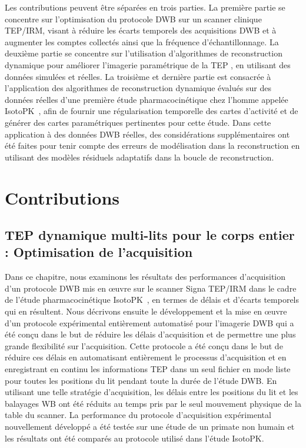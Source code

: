 Les contributions peuvent être séparées en trois parties. La première partie se concentre sur l'optimisation du protocole DWB sur un scanner clinique TEP/IRM, visant à réduire les écarts temporels des acquisitions DWB et à augmenter les comptes collectés ainsi que la fréquence d'échantillonnage. 
La deuxième partie se concentre sur l'utilisation d'algorithmes de reconstruction dynamique pour améliorer l'imagerie paramétrique de la TEP , en utilisant des données simulées et réelles.
La troisième et dernière partie est consacrée à l'application des algorithmes de reconstruction dynamique évalués sur des données réelles d'une première étude pharmacocinétique chez l'homme appelée IsotoPK~\cite{Marie2019}, afin de fournir une régularisation temporelle des cartes d'activité et de générer des cartes paramétriques pertinentes pour cette étude.
Dans cette application à des données DWB réelles, des considérations supplémentaires ont été faites pour tenir compte des erreurs de modélisation dans la reconstruction en utilisant des modèles résiduels adaptatifs dans la boucle de reconstruction.

\section*{Contributions}
\subsection*{TEP dynamique multi-lits pour le corps entier : Optimisation de l'acquisition}
Dans ce chapitre, nous examinons les résultats des performances d'acquisition d'un protocole DWB mis en œuvre sur le scanner Signa TEP/IRM dans le cadre de l'étude pharmacocinétique IsotoPK~\cite{Marie2019}, en termes de délais et d'écarts temporels qui en résultent.
Nous décrivons ensuite le développement et la mise en œuvre d'un protocole expérimental entièrement automatisé pour l'imagerie DWB qui a été conçu dans le but de réduire les délais d'acquisition et de permettre une plus grande flexibilité sur l'acquisition. Cette protocole a été conçu dans le but de réduire ces délais en automatisant entièrement le processus d'acquisition et en enregistrant en continu les informations TEP dans un seul fichier en mode liste pour toutes les positions du lit pendant toute la durée de l'étude DWB.
En utilisant une telle stratégie d'acquisition, les délais entre les positions du lit et les balayages WB ont été réduits au temps pris par le seul mouvement physique de la table du scanner. 
La performance du protocole d'acquisition expérimental nouvellement développé a été testée sur une étude de un primate non humain et les résultats ont été comparés au protocole utilisé dans l'étude IsotoPK.

